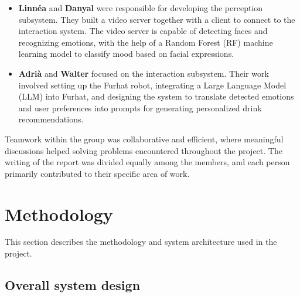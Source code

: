 \documentclass[conference]{IEEEtran}
\begin{document}
\begin{itemize}
    \item \textbf{Linnéa} and \textbf{Danyal} were responsible for developing the perception subsystem. They built a video server together with a client to connect to the interaction system. The video server is capable of detecting faces and recognizing emotions, with the help of a Random Forest (RF) machine learning model to classify mood based on facial expressions.
    
    
    \item \textbf{Adrià} and \textbf{Walter} focused on the interaction subsystem. Their work involved setting up the Furhat robot, integrating a Large Language Model (LLM) into Furhat, and designing the system to translate detected emotions and user preferences into prompts for generating personalized drink recommendations.

\end{itemize}

Teamwork within the group was collaborative and efficient, where meaningful discussions helped solving problems encountered throughout the project. The writing of the report was divided equally among the members, and each person primarily contributed to their specific area of work.
\\
\section{Methodology}

This section describes the methodology and system architecture used in the project.

\subsection{Overall system design}\label{sec:overallsysdesg}
\end{document}
